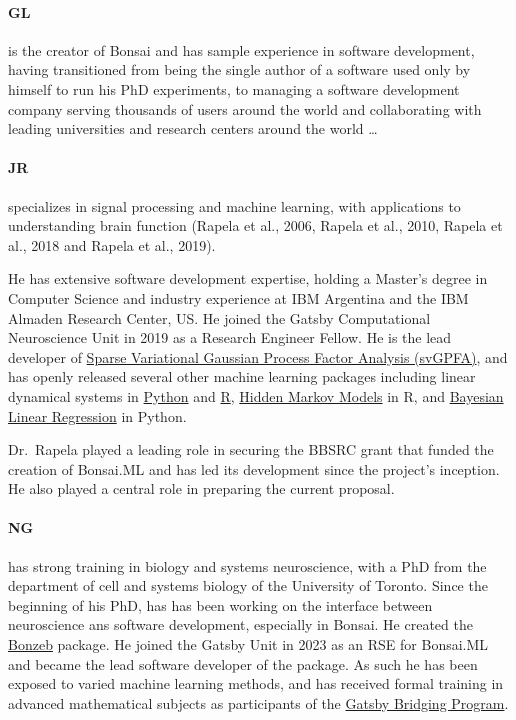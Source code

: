 \paragraph{GL} is the creator of Bonsai and
has sample experience in software development, having transitioned from being
the single author of a software used only by himself to run his PhD
experiments, to managing a software development company serving thousands of
users around the world and collaborating with leading universities and research
centers around the world \ldots

\paragraph{JR} specializes in
signal processing and machine learning, with applications to understanding
brain function (Rapela et al., 2006, Rapela et al., 2010, Rapela et al., 2018
and Rapela et al., 2019).

He has extensive software development expertise, holding a Master’s degree in
Computer Science and industry experience at IBM Argentina and the IBM Almaden
Research Center, US.
%
He joined the Gatsby Computational Neuroscience Unit in 2019 as a Research
Engineer Fellow.
%
He is the lead developer of \href{https://github.com/joacorapela/svGPFA}{Sparse
Variational Gaussian Process Factor Analysis (svGPFA)}, and has openly released
several other machine learning packages including linear dynamical systems in
\href{https://github.com/joacorapela/ssm}{Python} and
\href{https://github.com/joacorapela/kalmanFilter}{R},
\href{https://github.com/joacorapela/hiddenMarkovModels}{Hidden Markov Models}
in R, and
\href{https://github.com/joacorapela/bayesianLinearRegression}{Bayesian Linear
Regression} in Python.

Dr.~Rapela played a leading role in securing the BBSRC grant that funded the
creation of Bonsai.ML and has led its development since the project’s
inception. He also played a central role in preparing the current proposal.

\paragraph{NG} has strong
training in biology and systems neuroscience, with a PhD from the department of
cell and systems biology of the University of Toronto.
%
Since the beginning of his PhD, has has been working on the interface between
neuroscience ans software development, especially in Bonsai. He created the
\href{https://ncguilbeault.github.io/BonZeb/}{Bonzeb} package.
%
He joined the Gatsby Unit in 2023 as an RSE for Bonsai.ML and became the lead
software developer of the package.
%
As such he has been exposed to varied machine learning methods, and has
received formal training in advanced mathematical subjects as participants of
the
\href{https://www.ucl.ac.uk/gatsby/study-and-work/gatsby-bridging-programme}{Gatsby
Bridging Program}.


